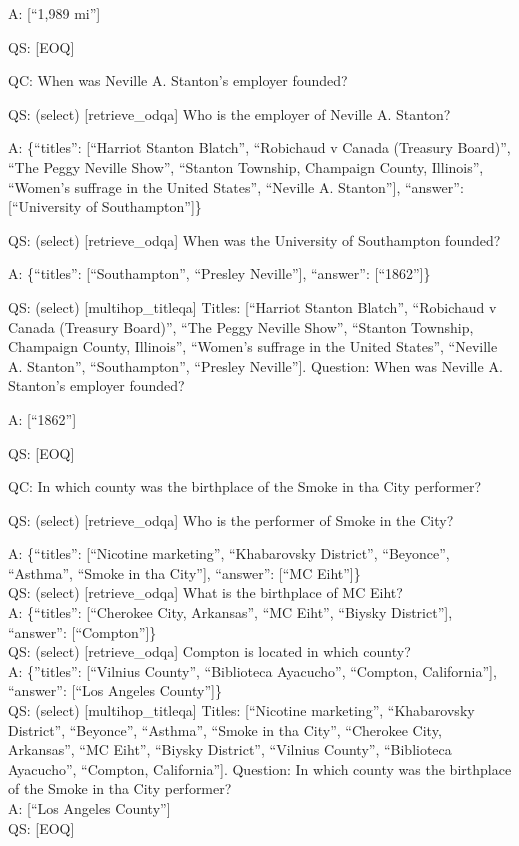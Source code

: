 \documentclass[
]{article}
\begin{document}
A: {[}``1,989 mi''{]}

QS: {[}EOQ{]}

QC: When was Neville A. Stanton's employer founded?

QS: (select) {[}retrieve\_odqa{]} Who is the employer of Neville A.
Stanton?

A: \{``titles'': {[}``Harriot Stanton Blatch'', ``Robichaud v Canada
(Treasury Board)'', ``The Peggy Neville Show'', ``Stanton Township,
Champaign County, Illinois'', ``Women's suffrage in the United States'',
``Neville A. Stanton''{]}, ``answer'': {[}``University of
Southampton''{]}\}

QS: (select) {[}retrieve\_odqa{]} When was the University of Southampton
founded?

A: \{``titles'': {[}``Southampton'', ``Presley Neville''{]}, ``answer'':
{[}``1862''{]}\}

QS: (select) {[}multihop\_titleqa{]} Titles: {[}``Harriot Stanton
Blatch'', ``Robichaud v Canada (Treasury Board)'', ``The Peggy Neville
Show'', ``Stanton Township, Champaign County, Illinois'', ``Women's
suffrage in the United States'', ``Neville A. Stanton'',
``Southampton'', ``Presley Neville''{]}. Question: When was Neville A.
Stanton's employer founded?

A: {[}``1862''{]}

QS: {[}EOQ{]}

QC: In which county was the birthplace of the Smoke in tha City
performer?

QS: (select) {[}retrieve\_odqa{]} Who is the performer of Smoke in the
City?

A: \{``titles'': {[}``Nicotine marketing'', ``Khabarovsky District'',
``Beyonce'', ``Asthma'', ``Smoke in tha City''{]}, ``answer'': {[}``MC
Eiht''{]}\}\\
QS: (select) {[}retrieve\_odqa{]} What is the birthplace of MC Eiht?\\
A: \{``titles'': {[}``Cherokee City, Arkansas'', ``MC Eiht'', ``Biysky
District''{]}, ``answer'': {[}``Compton''{]}\}\\
QS: (select) {[}retrieve\_odqa{]} Compton is located in which county?\\
A: \{''titles'': {[}``Vilnius County'', ``Biblioteca Ayacucho'',
``Compton, California''{]}, ``answer'': {[}``Los Angeles County''{]}\}\\
QS: (select) {[}multihop\_titleqa{]} Titles: {[}``Nicotine marketing'',
``Khabarovsky District'', ``Beyonce'', ``Asthma'', ``Smoke in tha
City'', ``Cherokee City, Arkansas'', ``MC Eiht'', ``Biysky District'',
``Vilnius County'', ``Biblioteca Ayacucho'', ``Compton, California''{]}.
Question: In which county was the birthplace of the Smoke in tha City
performer?\\
A: {[}``Los Angeles County''{]}\\
QS: {[}EOQ{]}
\end{document}
